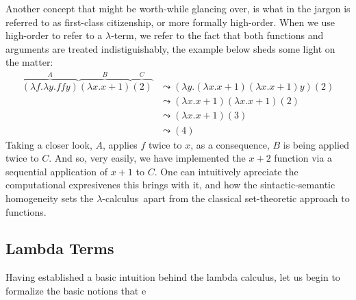 \documentclass[12pt]{book}
\newcommand{\lcalc}{$\lambda$-calculus}
\newcommand{\la}{$\lambda$}
\newcommand{\curly}{\mathrel{\leadsto}}
\theoremstyle{plain}
\theoremstyle{definition}
\theoremstyle{definition}
\theoremstyle{remark}
\begin{document}
Another concept that might be worth-while glancing over, is what in the jargon is referred to as first-class citizenship, or more formally high-order. When we use high-order to refer to a \la-term, we refer to the fact that both functions and arguments are treated indistiguishably, the example below sheds some light on the matter:
\begin{align*}
  \overbrace { (\lambda f . \lambda y . f f y) }^{A} \overbrace{ (\lambda x . x + 1) }^{B} \overbrace{(2)}^{C}
  &\curly (\lambda y .(\lambda x . x + 1) (\lambda x . x + 1)y)(2) \\
  &\curly (\lambda x . x + 1)(\lambda x . x + 1)(2) \\
  &\curly (\lambda x . x + 1) (3) \\
  &\curly (4)
\end{align*}
Taking a closer look, $A$, applies $f$ twice to $x$, as a consequence, $B$ is being applied twice to $C$. And so, very easily, we have implemented the $ x + 2 $ function via a sequential application of $x + 1$ to $C$. One can intuitively apreciate the computational expresivenes this brings with it, and how the sintactic-semantic homogeneity sets the \lcalc \ apart from the classical set-theoretic approach to functions.

\subsection{\centering
  Lambda Terms}

Having established a basic intuition behind the lambda calculus, let us begin to formalize the basic notions that e
\end{document}
